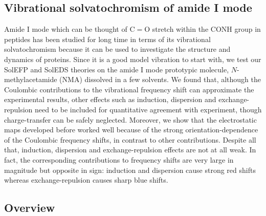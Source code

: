 \documentclass[a4paper,titlepage,twoside,fleqn,12pt]{book}
\begin{document}
\begin{refsection}
%


\printbibliography[heading=subbibintoc,title={References}]
\end{refsection}


\begin{refsection}
\chapter{Vibrational solvatochromism of amide I mode}

Amide I mode which can be thought of C$=$O stretch within
the CONH group in peptides has been studied for long time
in terms of its vibrational solvatochromism because it can
be used to investigate the structure and dynamics of proteins. 
Since it is a good model vibration to start with,
we test our SolEFP and SolEDS theories on the amide I mode
prototypic molecule, $N$-methylacetamide (NMA) dissolved
in a few solvents. We found that, although the Coulombic
contributions to the vibrational frequency shift can approximate
the experimental results, other effects such as induction,
dispersion and exchange\hyp{}repulsion need to be included
for quantitative agreement with experiment, though charge\hyp{}transfer
can be safely neglected. Moreover, we show that the electrostatic
maps developed before worked well because of the strong
orientation\hyp{}dependence of the Coulombic frequency shifts,
in contrast to other contributions. Despite all that, induction,
dispersion and exchange\hyp{}repulsion effects are not at all
weak. In fact, the corresponding contributions to frequency shifts
are very large in magnitude but opposite in sign: induction
and dispersion cause strong red shifts whereas exchange\hyp{}repulsion
causes sharp blue shifts.

\section{Overview}


\end{refsection}
\end{document}
